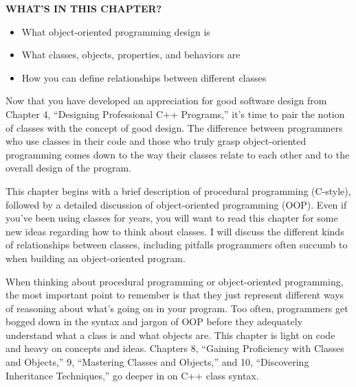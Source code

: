 \noindent
\textbf{WHAT’S IN THIS CHAPTER?}

\begin{itemize}
\item
What object-oriented programming design is

\item
What classes, objects, properties, and behaviors are

\item
How you can define relationships between different classes
\end{itemize}

Now that you have developed an appreciation for good software design from Chapter 4, “Designing Professional C++ Programs,” it’s time to pair the notion of classes with the concept of good design. The difference between programmers who use classes in their code and those who truly grasp object-oriented programming comes down to the way their classes relate to each other and to the overall design of the program.

This chapter begins with a brief description of procedural programming (C-style), followed by a detailed discussion of object-oriented programming (OOP). Even if you’ve been using classes for years, you will want to read this chapter for some new ideas regarding how to think about classes. I will discuss the different kinds of relationships between classes, including pitfalls programmers often succumb to when building an object-oriented program.

When thinking about procedural programming or object-oriented programming, the most important point to remember is that they just represent different ways of reasoning about what’s going on in your program. Too often, programmers get bogged down in the syntax and jargon of OOP before they adequately understand what a class is and what objects are. This chapter is light on code and heavy on concepts and ideas. Chapters 8, “Gaining Proficiency with Classes and Objects,” 9, “Mastering Classes and Objects,” and 10, “Discovering Inheritance Techniques,” go deeper in on C++ class syntax.















